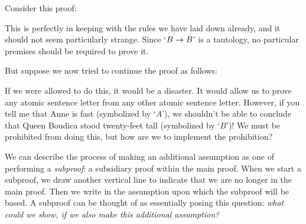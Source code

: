 Consider this proof:
\begin{fitchproof}
	\open
	 
	\close
\end{fitchproof}
This is perfectly in keeping with the rules we have laid down already, and it should not seem particularly strange. Since `$B \rightarrow B$' is a tautology, no particular premises should be required to prove it.

But suppose we now tried to continue the proof as follows:
\begin{fitchproof}
	\open
	 
	\close
\end{fitchproof}
If we were allowed to do this, it would be a disaster. It would allow us to prove any atomic sentence letter from any other atomic sentence letter. However, if you tell me that Anne is fast (symbolized by `$A$'), we shouldn't be able to conclude that Queen Boudica stood twenty-feet tall (symbolized by `$B$')! We must be prohibited from doing this, but how are we to implement the prohibition?

We can describe the process of making an additional assumption as one of performing a \emph{subproof}: a subsidiary proof within the main proof. When we start a subproof, we draw another vertical line to indicate that we are no longer in the main proof. Then we write in the assumption upon which the subproof will be based. A subproof can be thought of as essentially posing this question: \emph{what could we show, if we also make this additional assumption?}

